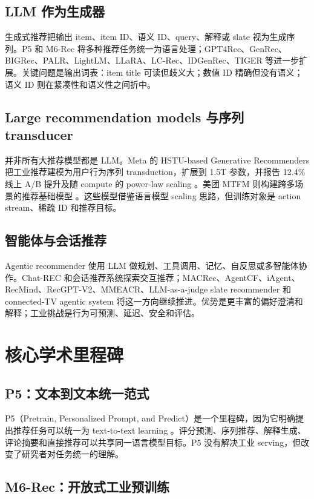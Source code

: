 \documentclass[UTF8,fontset=fandol,11pt]{ctexart}
\begin{document}
\subsection{LLM 作为生成器}

生成式推荐把输出 item、item ID、语义 ID、query、解释或 slate 视为生成序列。P5 和 M6-Rec 将多种推荐任务统一为语言处理；GPT4Rec、GenRec、BIGRec、PALR、LightLM、LLaRA、LC-Rec、IDGenRec、TIGER 等进一步扩展。关键问题是输出词表：item title 可读但歧义大；数值 ID 精确但没有语义；语义 ID 则在紧凑性和语义性之间折中。

\subsection{Large recommendation models 与序列 transducer}

并非所有大推荐模型都是 LLM。Meta 的 HSTU-based Generative Recommenders 把工业推荐建模为用户行为序列 transduction，扩展到 1.5T 参数，并报告 12.4\% 线上 A/B 提升及随 compute 的 power-law scaling \cite{hstu}。美团 MTFM 则构建跨多场景的推荐基础模型 \cite{mtfm}。这些模型借鉴语言模型 scaling 思路，但训练对象是 action stream、稀疏 ID 和推荐目标。

\subsection{智能体与会话推荐}

Agentic recommender 使用 LLM 做规划、工具调用、记忆、自反思或多智能体协作。Chat-REC 和会话推荐系统探索交互推荐；MACRec、AgentCF、iAgent、RecMind、RecGPT-V2、MMEACR、LLM-as-a-judge slate recommender 和 connected-TV agentic system 将这一方向继续推进。优势是更丰富的偏好澄清和解释；工业挑战是行为可预测、延迟、安全和评估。

\section{核心学术里程碑}

\subsection{P5：文本到文本统一范式}

P5（Pretrain, Personalized Prompt, and Predict）是一个里程碑，因为它明确提出推荐任务可以统一为 text-to-text learning \cite{p5}。评分预测、序列推荐、解释生成、评论摘要和直接推荐可以共享同一语言模型目标。P5 没有解决工业 serving，但改变了研究者对任务统一的理解。

\subsection{M6-Rec：开放式工业预训练}
\end{document}
